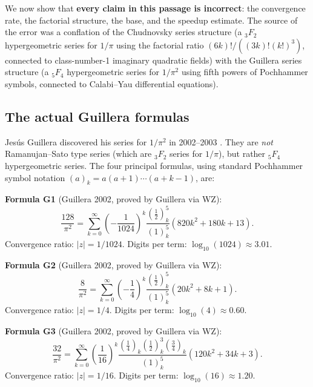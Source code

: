 \documentclass[11pt]{article}
\begin{document}
We now show that \textbf{every claim in this passage is incorrect}: the convergence rate, the factorial structure, the base, and the speedup estimate. The source of the error was a conflation of the Chudnovsky series structure (a ${}_3F_2$ hypergeometric series for $1/\pi$ using the factorial ratio $(6k)!/((3k)!(k!)^3)$, connected to class-number-1 imaginary quadratic fields) with the Guillera series structure (a ${}_5F_4$ hypergeometric series for $1/\pi^2$ using fifth powers of Pochhammer symbols, connected to Calabi--Yau differential equations).

\subsection{The actual Guillera formulas}

Jes\'us Guillera discovered his series for $1/\pi^2$ in 2002--2003 \cite{guillera2003}. They are \emph{not} Ramanujan--Sato type series (which are ${}_3F_2$ series for $1/\pi$), but rather ${}_5F_4$ hypergeometric series. The four principal formulas, using standard Pochhammer symbol notation $(a)_k = a(a+1)\cdots(a+k-1)$, are:

\medskip

\noindent\textbf{Formula G1} (Guillera 2002, proved by Guillera via WZ):
\begin{equation}\label{eq:G1}
\frac{128}{\pi^2} = \sum_{k=0}^{\infty} \left(-\frac{1}{1024}\right)^k \frac{(\tfrac{1}{2})_k^5}{(1)_k^5} \left(820k^2 + 180k + 13\right).
\end{equation}
Convergence ratio: $|z| = 1/1024$. Digits per term: $\log_{10}(1024) \approx \mathbf{3.01}$.

\medskip

\noindent\textbf{Formula G2} (Guillera 2002, proved by Guillera via WZ):
\begin{equation}\label{eq:G2}
\frac{8}{\pi^2} = \sum_{k=0}^{\infty} \left(-\frac{1}{4}\right)^k \frac{(\tfrac{1}{2})_k^5}{(1)_k^5} \left(20k^2 + 8k + 1\right).
\end{equation}
Convergence ratio: $|z| = 1/4$. Digits per term: $\log_{10}(4) \approx \mathbf{0.60}$.

\medskip

\noindent\textbf{Formula G3} (Guillera 2002, proved by Guillera via WZ):
\begin{equation}\label{eq:G3}
\frac{32}{\pi^2} = \sum_{k=0}^{\infty} \left(\frac{1}{16}\right)^k \frac{(\tfrac{1}{4})_k(\tfrac{1}{2})_k^3(\tfrac{3}{4})_k}{(1)_k^5} \left(120k^2 + 34k + 3\right).
\end{equation}
Convergence ratio: $|z| = 1/16$. Digits per term: $\log_{10}(16) \approx \mathbf{1.20}$.
\end{document}
